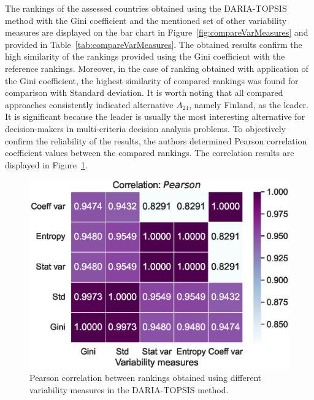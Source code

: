 \documentclass[5p,times]{elsarticle}
\begin{document}
The rankings of the assessed countries obtained using the DARIA-TOPSIS method with the Gini coefficient and the mentioned set of other variability measures are displayed on the bar chart in Figure~\ref{fig:compareVarMeasures} and provided in Table~\ref{tab:compareVarMeasures}. The obtained results confirm the high similarity of the rankings provided using the Gini coefficient with the reference rankings. Moreover, in the case of ranking obtained with application of the Gini coefficient, the highest similarity of compared rankings was found for comparison with Standard deviation. It is worth noting that all compared approaches consistently indicated alternative $A_{24}$, namely Finland, as the leader. It is significant because the leader is usually the most interesting alternative for decision-makers in multi-criteria decision analysis problems. To objectively confirm the reliability of the results, the authors determined Pearson correlation coefficient values between the compared rankings. The correlation results are displayed in Figure~\ref{fig:compareVarMeasuresCorrs}. 

%
\begin{figure}[H]
    \centering
    \includegraphics[width=0.7\linewidth]{pearson.eps}
    \caption{Pearson correlation between rankings obtained using different variability measures in the DARIA-TOPSIS method.}
    \label{fig:compareVarMeasuresCorrs}
\end{figure}
%
\end{document}
